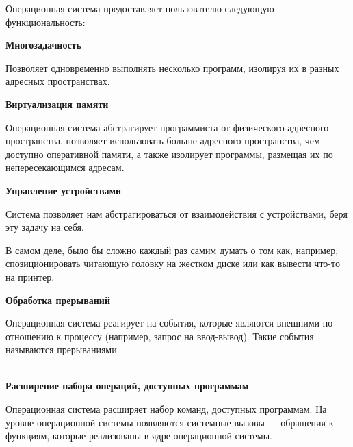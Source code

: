 Операционная система предоставляет пользователю следующую функциональность:

\textbf{Многозадачность}

Позволяет одновременно выполнять несколько программ, изолируя их в разных адресных пространствах.

\textbf{Виртуализация памяти}

Операционная система абстрагирует программиста от физического адресного пространства, позволяет использовать больше адресного пространства, чем доступно оперативной памяти, а также изолирует программы, размещая их по непересекающимся адресам.

\textbf{Управление устройствами}

Система позволяет нам абстрагироваться от взаимодействия с устройствами, беря эту задачу на себя.

В самом деле, было бы сложно каждый раз самим думать о том как, например, спозиционировать читающую головку на жестком диске или как вывести что-то на принтер.

\textbf{Обработка прерываний}

Операционная система реагирует на события, которые являются внешними по отношению к процессу (например, запрос на ввод-вывод). Такие события называются прерываниями.

\\
\textbf{Расширение набора операций, доступных программам}

Операционная система расширяет набор команд, доступных программам. На уровне операционной системы появляются системные вызовы --- обращения к функциям, которые реализованы в ядре операционной системы. 
